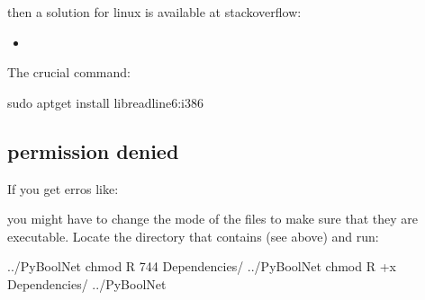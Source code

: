 \documentclass[letterpaper,10pt,english]{sphinxmanual}
\begin{document}
\begin{sphinxVerbatim}[commandchars=\\\{\}]
      
         
\end{sphinxVerbatim}

then a solution for linux is available at stackoverflow:
\begin{itemize}
\item {} 

\end{itemize}

The crucial command:

\begin{sphinxVerbatim}[commandchars=\\\{\}]
\PYGZdl{} sudo apt\PYGZhy{}get install libreadline6:i386
\end{sphinxVerbatim}


\subsection{permission denied}
\label{\detokenize{Installation:permission-denied}}
If you get  erros like:

\begin{sphinxVerbatim}[commandchars=\\\{\}]
 \PYG{p}{[} \PYG{p}{]}  
\end{sphinxVerbatim}

you might have to change the mode of the files to make sure that they are executable.
Locate the directory that contains  (see {\hyperref[\detokenize{Installation:installation-software}]{}} above) and run:

\begin{sphinxVerbatim}[commandchars=\\\{\}]
../PyBoolNet\PYGZdl{} chmod \PYGZhy{}R 744 Dependencies/
../PyBoolNet\PYGZdl{} chmod \PYGZhy{}R +x Dependencies/
../PyBoolNet\PYGZdl{}
\end{sphinxVerbatim}
\end{document}
